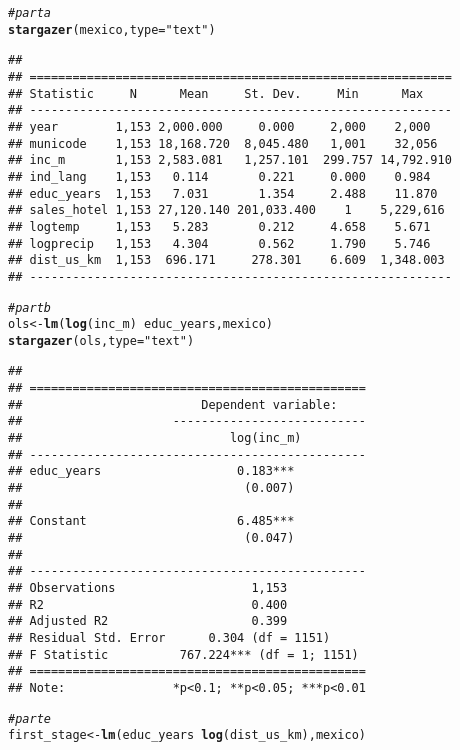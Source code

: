 \documentclass{article}\usepackage[]{graphicx}\usepackage[]{xcolor}
\makeatletter
\newcommand{\hlstr}[1]{\textcolor[rgb]{0.192,0.494,0.8}{#1}}%
\newcommand{\hlcom}[1]{\textcolor[rgb]{0.678,0.584,0.686}{\textit{#1}}}%
\newcommand{\hlopt}[1]{\textcolor[rgb]{0,0,0}{#1}}%
\newcommand{\hlstd}[1]{\textcolor[rgb]{0.345,0.345,0.345}{#1}}%
\newcommand{\hlkwb}[1]{\textcolor[rgb]{0.69,0.353,0.396}{#1}}%
\newcommand{\hlkwc}[1]{\textcolor[rgb]{0.333,0.667,0.333}{#1}}%
\newcommand{\hlkwd}[1]{\textcolor[rgb]{0.737,0.353,0.396}{\textbf{#1}}}%
\newenvironment{kframe}{%
 \def\at@end@of@kframe{}%
 \ifinner\ifhmode%
  \def\at@end@of@kframe{\end{minipage}}%
  \begin{minipage}{\columnwidth}%
 \fi\fi%
 \def\FrameCommand##1{\hskip\@totalleftmargin \hskip-\fboxsep
 \colorbox{shadecolor}{##1}\hskip-\fboxsep
     \hskip-\linewidth \hskip-\@totalleftmargin \hskip\columnwidth}%
 \MakeFramed {\advance\hsize-\width
   \@totalleftmargin\z@ \linewidth\hsize
   \@setminipage}}%
 {\par\unskip\endMakeFramed%
 \at@end@of@kframe}
\newenvironment{knitrout}{}{} %
\makeatother
\begin{document}
\begin{knitrout}
\begin{kframe}
\begin{alltt}
    \hlcom{# part a}
    \hlkwd{stargazer}\hlstd{(mexico,} \hlkwc{type} \hlstd{=} \hlstr{"text"}\hlstd{)}
\end{alltt}
\begin{verbatim}
## 
## ===========================================================
## Statistic     N      Mean     St. Dev.     Min      Max    
## -----------------------------------------------------------
## year        1,153 2,000.000     0.000     2,000    2,000   
## municode    1,153 18,168.720  8,045.480   1,001    32,056  
## inc_m       1,153 2,583.081   1,257.101  299.757 14,792.910
## ind_lang    1,153   0.114       0.221     0.000    0.984   
## educ_years  1,153   7.031       1.354     2.488    11.870  
## sales_hotel 1,153 27,120.140 201,033.400    1    5,229,616 
## logtemp     1,153   5.283       0.212     4.658    5.671   
## logprecip   1,153   4.304       0.562     1.790    5.746   
## dist_us_km  1,153  696.171     278.301    6.609  1,348.003 
## -----------------------------------------------------------
\end{verbatim}
\begin{alltt}
    \hlcom{# part b}
    \hlstd{ols} \hlkwb{<-} \hlkwd{lm}\hlstd{(}\hlkwd{log}\hlstd{(inc_m)} \hlopt{~} \hlstd{educ_years, mexico)}
    \hlkwd{stargazer}\hlstd{(ols,} \hlkwc{type} \hlstd{=} \hlstr{"text"}\hlstd{)}
\end{alltt}
\begin{verbatim}
## 
## ===============================================
##                         Dependent variable:    
##                     ---------------------------
##                             log(inc_m)         
## -----------------------------------------------
## educ_years                   0.183***          
##                               (0.007)          
##                                                
## Constant                     6.485***          
##                               (0.047)          
##                                                
## -----------------------------------------------
## Observations                   1,153           
## R2                             0.400           
## Adjusted R2                    0.399           
## Residual Std. Error      0.304 (df = 1151)     
## F Statistic          767.224*** (df = 1; 1151) 
## ===============================================
## Note:               *p<0.1; **p<0.05; ***p<0.01
\end{verbatim}
\begin{alltt}
    \hlcom{# part e}
    \hlstd{first_stage} \hlkwb{<-} \hlkwd{lm}\hlstd{(educ_years} \hlopt{~} \hlkwd{log}\hlstd{(dist_us_km), mexico)}

\end{alltt}
\end{kframe}
\end{knitrout}
\end{document}

